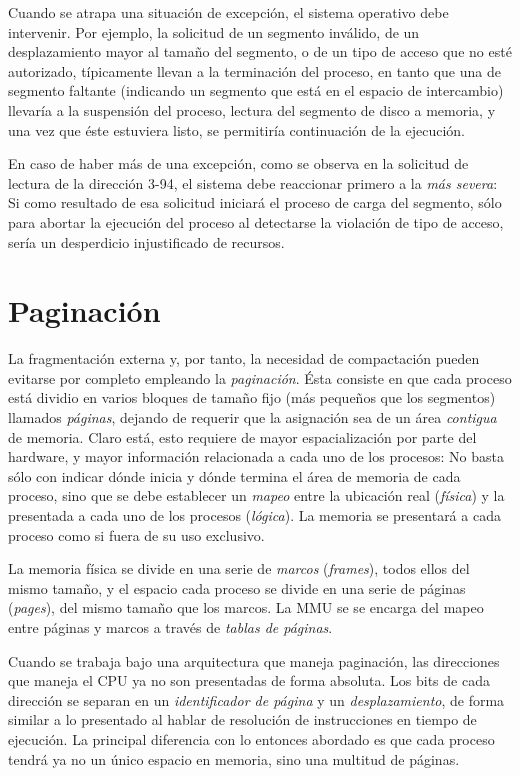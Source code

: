 \documentclass[11pt,fleqn]{book} %
\begin{document}
Cuando se atrapa una situación de excepción, el sistema operativo debe
intervenir. Por ejemplo, la solicitud de un segmento inválido, de un
desplazamiento mayor al tamaño del segmento, o de un tipo de acceso
que no esté autorizado, típicamente llevan a la terminación del
proceso, en tanto que una de segmento faltante (indicando un segmento
que está en el espacio de intercambio) llevaría a la suspensión del
proceso, lectura del segmento de disco a memoria, y una vez que éste
estuviera listo, se permitiría continuación de la ejecución.

En caso de haber más de una excepción, como se observa en la
solicitud de lectura de la dirección 3-94, el sistema debe reaccionar
primero a la \emph{más severa}: Si como resultado de esa solicitud iniciará
el proceso de carga del segmento, sólo para abortar la ejecución del
proceso al detectarse la violación de tipo de acceso, sería un
desperdicio injustificado de recursos.
\section{Paginación}
\label{sec-5-4}
\label{MEM_paginacion}


La fragmentación externa y, por tanto, la necesidad de compactación
pueden evitarse por completo empleando la \emph{paginación}. Ésta consiste
en que cada proceso está dividio en varios bloques
de tamaño fijo (más pequeños que los segmentos) llamados \emph{páginas}, dejando
de requerir que la asignación sea de un área \emph{contigua} de
memoria. Claro está, esto requiere de mayor espacialización por parte
del hardware, y mayor información relacionada a cada uno de los
procesos: No basta sólo con indicar dónde inicia y dónde termina el
área de memoria de cada proceso, sino que se debe establecer un \emph{mapeo}
entre la ubicación real (\emph{física}) y la presentada a cada uno de los
procesos (\emph{lógica}). La memoria se presentará a cada proceso como si
fuera de su uso exclusivo.

La memoria física se divide en una serie de \emph{marcos} (\emph{frames}), todos
ellos del mismo tamaño, y el espacio cada proceso se divide en una
serie de páginas (\emph{pages}), del mismo tamaño que los marcos. La MMU se
se encarga del mapeo entre páginas y marcos a través de \emph{tablas de páginas}.

Cuando se trabaja bajo una arquitectura que maneja paginación, las
direcciones que maneja el CPU ya no son presentadas de forma absoluta.
Los bits de cada dirección se separan en un \emph{identificador de página} y un
\emph{desplazamiento}, de forma similar a lo presentado al hablar de
resolución de instrucciones en tiempo de ejecución. La principal
diferencia con lo entonces abordado es que cada proceso tendrá ya no
un único espacio en memoria, sino una multitud de páginas.
\end{document}
